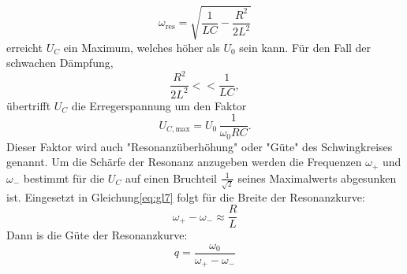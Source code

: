\begin{equation}
  \omega_\text{res} =\sqrt{\frac{1}{LC}-\frac{R^2}{2L^2}}
\end{equation}
erreicht $U_C$ ein Maximum, welches höher als $U_0$ sein kann.
Für den Fall der schwachen Dämpfung,
\begin{equation}
  \frac{R^2}{2L^2}<<\frac{1}{LC} ,
\end{equation}
übertrifft $U_C$ die Erregerspannung um den Faktor
\begin{equation}
    U_{C,\text{max}} = U_0 \, \frac{1}{\omega_0 R C}.
    \label{eqn:umax}
\end{equation}
Dieser Faktor wird auch "Resonanzüberhöhung" oder "Güte" des Schwingkreises genannt.
Um die Schärfe der Resonanz anzugeben werden die Frequenzen $\omega_+$ und $\omega_-$ bestimmt für die $U_C$ auf einen Bruchteil $\frac{1}{\sqrt{2}}$ seines Maximalwerts abgesunken ist.
Eingesetzt in Gleichung\eqref{eq:gl7} folgt für die Breite der Resonanzkurve:
\begin{equation}
  \omega_+ - \omega_- \approx \frac{R}{L}
    \label{eqn:breite}
\end{equation}
Dann is die Güte der Resonanzkurve:
\begin{equation}
  q = \frac{\omega_0}{\omega_+ - \omega_-}
\end{equation}
